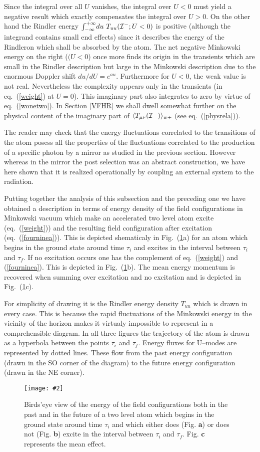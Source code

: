 \documentclass[12pt,oneside]{report}
\newcommand{\dessin}[4]
{\begin{figure}[tp]\begin{center}
\texttt{[image: \#2]}%
\end{center}
\caption{#4}
\label{#3}
\end{figure}}
\begin{document}
Since the integral over all $U$ vanishes, the integral over $U<0$
must yield a negative result which exactly compensates the integral over
$U>0$. On the other hand the Rindler energy 
$\int_{-\infty}^{+\infty}\! du \ T_{uu}({\cal{I^-}};U<0)$ is
positive (although the integrand contains small end effects) since it
describes the energy of the Rindleron which shall be absorbed by the atom.
The net negative Minkowski energy on the right ($(U<0$) 
once more finds its origin in the transients which
are small in the Rindler description but large in the Minkowski
description due to the enormous Doppler shift $du/ dU = e^{a u}$.
Furthermore for $U<0$, the weak value is not real. Nevertheless
the complexity
appears only in the transients (in eq.~(\ref{weight}) at $U=0$). This imaginary
part also integrates to zero by virtue of eq.~(\ref{wonetwo}). In Section
\ref{VFHR} we shall dwell somewhat further on the physical content of the
imaginary part of $\langle T_{\mu\nu} ({\cal{I^-}})\rangle _{w +}$
(see eq.~(\ref{physrela})).

The reader may check that the energy fluctuations correlated
to the transitions of the atom posess all the properties of the 
fluctuations correlated to the production of a specific photon 
by a mirror as studied in the previous section. However whereas in the mirror
the post selection was an abstract construction, we have here shown that it is
realized operationally by coupling an external system to the radiation.

Putting together the analysis of this subsection  and the
preceding one  we have obtained a  description in terms of
energy density of the field configurations in Minkowski vacuum which make an
accelerated two level atom excite 
(eq.~(\ref{weight})) and the resulting field configuration after excitation
(eq.~(\ref{fourninea})). This is depicted shematicaly in Fig.~(\ref{excit}a)
for an atom which begins in the ground  state around time $\tau_i$ and
 excites in the 
interval between $\tau_i$ and
$\tau_f$. If no excitation occurs one has the complement of eq.~(\ref{weight})
and (\ref{fourninea}). This is depicted in Fig.~(\ref{excit}b). The mean
energy momentum is recovered when summing over excitation and no
excitation and is depicted in Fig.~(\ref{excit}c).  


For simplicity of drawing it is the Rindler energy density $T_{uu}$ 
which is drawn in every
case. This is because the rapid fluctuations of the Minkowski energy 
in the vicinity of the
horizon makes it virtualy impossible to represent in a comprehensible 
diagram.
In all three figures the trajectory of the atom is drawn as a 
hyperbola between the points
$\tau_i$ and $\tau_f$. Energy fluxes for U--modes are 
represented by dotted lines. These flow
from the past energy configuration (drawn in the SO 
corner of the diagram) to the future energy
configuration (drawn in the NE corner).
\dessin{1.000}{NFIG2-5A.eps}{excit}
{Birds'eye view of the energy of the field 
configurations both in the past
and in the future of a two level atom which begins in the ground 
state around time $\tau_i$ and
which either does (Fig. {\bf a}) or does not (Fig. {\bf b}) excite in the 
interval between $\tau_i$ and
$\tau_f$. Fig. {\bf c} represents the mean effect.}
\end{document}
